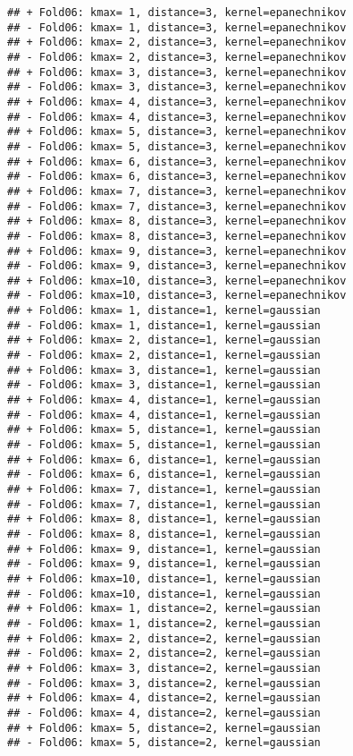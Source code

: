 \documentclass[
]{article}
\begin{document}
\begin{verbatim}
## + Fold06: kmax= 1, distance=3, kernel=epanechnikov 
## - Fold06: kmax= 1, distance=3, kernel=epanechnikov 
## + Fold06: kmax= 2, distance=3, kernel=epanechnikov 
## - Fold06: kmax= 2, distance=3, kernel=epanechnikov 
## + Fold06: kmax= 3, distance=3, kernel=epanechnikov 
## - Fold06: kmax= 3, distance=3, kernel=epanechnikov 
## + Fold06: kmax= 4, distance=3, kernel=epanechnikov 
## - Fold06: kmax= 4, distance=3, kernel=epanechnikov 
## + Fold06: kmax= 5, distance=3, kernel=epanechnikov 
## - Fold06: kmax= 5, distance=3, kernel=epanechnikov 
## + Fold06: kmax= 6, distance=3, kernel=epanechnikov 
## - Fold06: kmax= 6, distance=3, kernel=epanechnikov 
## + Fold06: kmax= 7, distance=3, kernel=epanechnikov 
## - Fold06: kmax= 7, distance=3, kernel=epanechnikov 
## + Fold06: kmax= 8, distance=3, kernel=epanechnikov 
## - Fold06: kmax= 8, distance=3, kernel=epanechnikov 
## + Fold06: kmax= 9, distance=3, kernel=epanechnikov 
## - Fold06: kmax= 9, distance=3, kernel=epanechnikov 
## + Fold06: kmax=10, distance=3, kernel=epanechnikov 
## - Fold06: kmax=10, distance=3, kernel=epanechnikov 
## + Fold06: kmax= 1, distance=1, kernel=gaussian 
## - Fold06: kmax= 1, distance=1, kernel=gaussian 
## + Fold06: kmax= 2, distance=1, kernel=gaussian 
## - Fold06: kmax= 2, distance=1, kernel=gaussian 
## + Fold06: kmax= 3, distance=1, kernel=gaussian 
## - Fold06: kmax= 3, distance=1, kernel=gaussian 
## + Fold06: kmax= 4, distance=1, kernel=gaussian 
## - Fold06: kmax= 4, distance=1, kernel=gaussian 
## + Fold06: kmax= 5, distance=1, kernel=gaussian 
## - Fold06: kmax= 5, distance=1, kernel=gaussian 
## + Fold06: kmax= 6, distance=1, kernel=gaussian 
## - Fold06: kmax= 6, distance=1, kernel=gaussian 
## + Fold06: kmax= 7, distance=1, kernel=gaussian 
## - Fold06: kmax= 7, distance=1, kernel=gaussian 
## + Fold06: kmax= 8, distance=1, kernel=gaussian 
## - Fold06: kmax= 8, distance=1, kernel=gaussian 
## + Fold06: kmax= 9, distance=1, kernel=gaussian 
## - Fold06: kmax= 9, distance=1, kernel=gaussian 
## + Fold06: kmax=10, distance=1, kernel=gaussian 
## - Fold06: kmax=10, distance=1, kernel=gaussian 
## + Fold06: kmax= 1, distance=2, kernel=gaussian 
## - Fold06: kmax= 1, distance=2, kernel=gaussian 
## + Fold06: kmax= 2, distance=2, kernel=gaussian 
## - Fold06: kmax= 2, distance=2, kernel=gaussian 
## + Fold06: kmax= 3, distance=2, kernel=gaussian 
## - Fold06: kmax= 3, distance=2, kernel=gaussian 
## + Fold06: kmax= 4, distance=2, kernel=gaussian 
## - Fold06: kmax= 4, distance=2, kernel=gaussian 
## + Fold06: kmax= 5, distance=2, kernel=gaussian 
## - Fold06: kmax= 5, distance=2, kernel=gaussian 

\end{verbatim}
\end{document}
